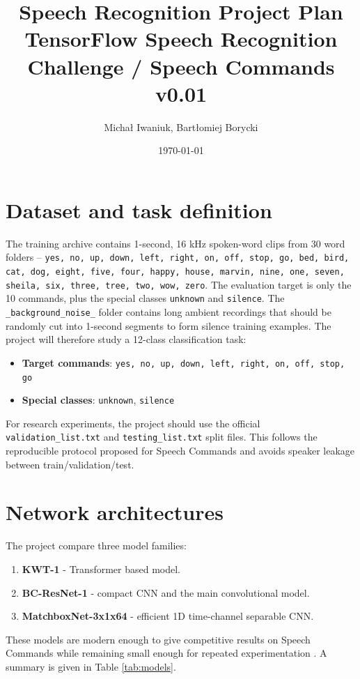 \documentclass[11pt]{article}
\title{\textbf{Speech Recognition Project Plan}\\
\large TensorFlow Speech Recognition Challenge / Speech Commands v0.01}
\author{Michał Iwaniuk, Bartłomiej Borycki}
\date{\today}
\begin{document}
\maketitle


\section{Dataset and task definition}

The training archive contains 1-second, 16 kHz spoken-word clips from 30 word folders -- \texttt{yes, no, up, down, left, right, on, off, stop, go, bed, bird, cat, dog, eight, five, four, happy, house, marvin, nine, one, seven, sheila, six, three, tree, two, wow, zero}. The evaluation target is only the 10 commands, plus the special classes \texttt{unknown} and \texttt{silence}. The \texttt{\_background\_noise\_} folder contains long ambient recordings that should be randomly cut into 1-second segments to form silence training examples. The project will therefore study a 12-class classification task:
\begin{itemize}[leftmargin=*]
    \item \textbf{Target commands}: \texttt{yes, no, up, down, left, right, on, off, stop, go}
    \item \textbf{Special classes}: \texttt{unknown}, \texttt{silence}
\end{itemize}


For research experiments, the project should use the official \texttt{validation\_list.txt} and \texttt{testing\_list.txt} split files. This follows the reproducible protocol proposed for Speech Commands and avoids speaker leakage between train/validation/test.


\section{Network architectures}

The project compare three model families:

\begin{enumerate}[leftmargin=*]
    \item \textbf{KWT-1} - Transformer based model.
    \item \textbf{BC-ResNet-1} - compact CNN and the main convolutional model.
    \item \textbf{MatchboxNet-3x1x64} - efficient 1D time-channel separable CNN.
\end{enumerate}

These models are modern enough to give competitive results on Speech Commands while remaining small enough for repeated experimentation \cite{bcresnet,kwt,matchbox}. A summary is given in Table \ref{tab:models}.
\end{document}
